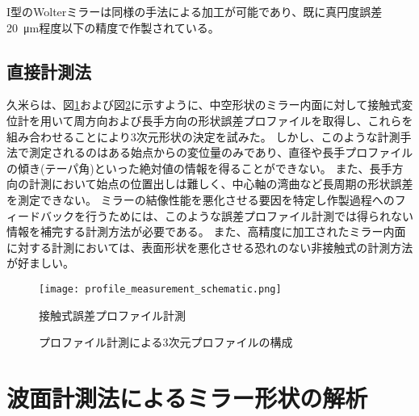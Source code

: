 I型のWolterミラーは同様の手法による加工が可能であり、既に真円度誤差\SI{20}{\micro \metre}程度以下の精度で作製されている。\cite{Yamaguchi2020}

\subsection{直接計測法}
\label{chap1_direct_measurement}

久米らは、図\ref{fig:profile_measurement_schematic}および図\ref{fig:profile_measurement}に示すように、中空形状のミラー内面に対して接触式変位計を用いて周方向および長手方向の形状誤差プロファイルを取得し、これらを組み合わせることにより3次元形状の決定を試みた。\cite{Kume2017}
しかし、このような計測手法で測定されるのはある始点からの変位量のみであり、直径や長手プロファイルの傾き(テーパ角)といった絶対値の情報を得ることができない。
また、長手方向の計測において始点の位置出しは難しく、中心軸の湾曲など長周期の形状誤差を測定できない。
ミラーの結像性能を悪化させる要因を特定し作製過程へのフィードバックを行うためには、このような誤差プロファイル計測では得られない情報を補完する計測方法が必要である。
また、高精度に加工されたミラー内面に対する計測においては、表面形状を悪化させる恐れのない非接触式の計測方法が好ましい。

\begin{figure}[h]
\centering
\texttt{[image: profile\_measurement\_schematic.png]}
\caption{接触式誤差プロファイル計測}
\label{fig:profile_measurement_schematic}
\end{figure}

\begin{figure}[!ht]
\centering
{}
\caption[]{プロファイル計測による3次元プロファイルの構成}
\label{fig:profile_measurement}
\end{figure}


\clearpage
\newpage
\section{波面計測法によるミラー形状の解析}
\label{chap1_wave_metrics}

